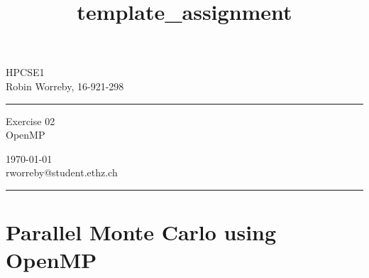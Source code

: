 \documentclass[a4paper,10pt]{article} %
\begin{document}

\title{template_assignment} %
\fancyhead[C]{}
\begin{minipage}{0.295\textwidth} %
\raggedright
HPCSE1\\ %
\footnotesize %
Robin Worreby, 16-921-298 %
\medskip\hrule
\end{minipage}
\begin{minipage}{0.4\textwidth} %
\centering 
\large %
Exercise 02\\ %
\normalsize %
OpenMP\\ %
\end{minipage}
\begin{minipage}{0.295\textwidth} %
\raggedleft
\today\\ %
\footnotesize %
rworreby@student.ethz.ch%
\medskip\hrule
\end{minipage}


\setcounter{section}{0}

\section{Parallel Monte Carlo using OpenMP}
\end{document}
